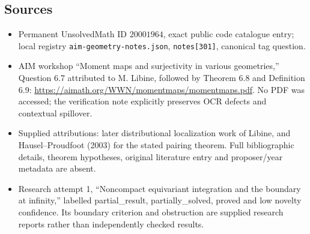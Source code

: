 \documentclass[11pt]{article}
\begin{document}
\subsection{Sources}
\begin{itemize}
\item Permanent UnsolvedMath ID \(20001964\), exact public code catalogue entry; local registry \texttt{aim-geometry-notes.json}, \texttt{notes[301]}, canonical tag question.
\item AIM workshop ``Moment maps and surjectivity in various geometries,'' Question 6.7 attributed to M. Libine, followed by Theorem 6.8 and Definition 6.9: \url{https://aimath.org/WWN/momentmaps/momentmaps.pdf}. No PDF was accessed; the verification note explicitly preserves OCR defects and contextual spillover.
\item Supplied attributions: later distributional localization work of Libine, and Hausel--Proudfoot (2003) for the stated pairing theorem. Full bibliographic details, theorem hypotheses, original literature entry and proposer/year metadata are absent.
\item Research attempt 1, ``Noncompact equivariant integration and the boundary at infinity,'' labelled partial\_result, partially\_solved, proved and low novelty confidence. Its boundary criterion and obstruction are supplied research reports rather than independently checked results.
\end{itemize}
\end{document}
